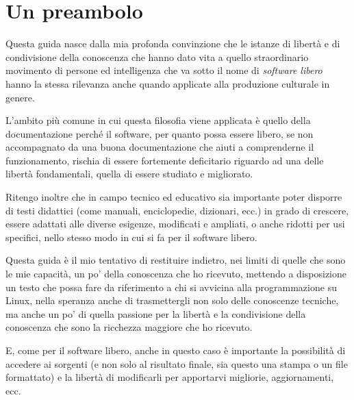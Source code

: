 
\chapter{Un preambolo}
\label{cha:preamble}

Questa guida nasce dalla mia profonda convinzione che le istanze di libertà e
di condivisione della conoscenza che hanno dato vita a quello straordinario
movimento di persone ed intelligenza che va sotto il nome di \textsl{software
  libero} hanno la stessa rilevanza anche quando applicate alla produzione
culturale in genere.

L'ambito più comune in cui questa filosofia viene applicata è quello della
documentazione perché il software, per quanto possa essere libero, se non
accompagnato da una buona documentazione che aiuti a comprenderne il
funzionamento, rischia di essere fortemente deficitario riguardo ad una delle
libertà fondamentali, quella di essere studiato e migliorato.

Ritengo inoltre che in campo tecnico ed educativo sia importante poter
disporre di testi didattici (come manuali, enciclopedie, dizionari, ecc.) in
grado di crescere, essere adattati alle diverse esigenze, modificati e
ampliati, o anche ridotti per usi specifici, nello stesso modo in cui si fa
per il software libero.

Questa guida è il mio tentativo di restituire indietro, nei limiti di quelle
che sono le mie capacità, un po' della conoscenza che ho ricevuto, mettendo a
disposizione un testo che possa fare da riferimento a chi si avvicina alla
programmazione su Linux, nella speranza anche di trasmettergli non solo delle
conoscenze tecniche, ma anche un po' di quella passione per la libertà e la
condivisione della conoscenza che sono la ricchezza maggiore che ho ricevuto.

E, come per il software libero, anche in questo caso è importante la
possibilità di accedere ai sorgenti (e non solo al risultato finale, sia
questo una stampa o un file formattato) e la libertà di modificarli per
apportarvi migliorie, aggiornamenti, ecc.

